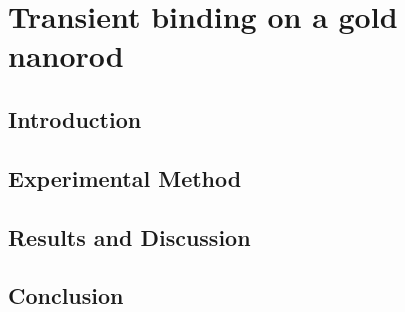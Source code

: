 \chapter{Transient binding on a gold nanorod}
\section{Introduction}
\section{Experimental Method}
\section{Results and Discussion}
\section{Conclusion}